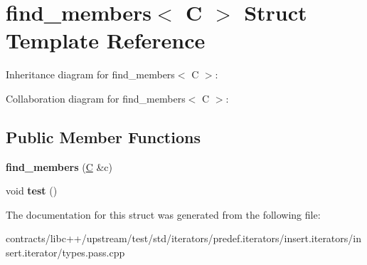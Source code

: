 \hypertarget{structfind__members}{}\section{find\+\_\+members$<$ C $>$ Struct Template Reference}
\label{structfind__members}


Inheritance diagram for find\+\_\+members$<$ C $>$\+:


Collaboration diagram for find\+\_\+members$<$ C $>$\+:
\subsection*{Public Member Functions}
\begin{DoxyCompactItemize}
\item 
\mbox{\label{structfind__members_a7dd876baa7f8ad06071b821a01369af6}} 
{\bfseries find\+\_\+members} (\mbox{\hyperlink{struct_c}{C}} \&c)
\item 
\mbox{\label{structfind__members_ac07ec46e8701a7bd1600c0a17fd39d88}} 
void {\bfseries test} ()
\end{DoxyCompactItemize}


The documentation for this struct was generated from the following file\+:\begin{DoxyCompactItemize}
\item 
contracts/libc++/upstream/test/std/iterators/predef.\+iterators/insert.\+iterators/insert.\+iterator/types.\+pass.\+cpp\end{DoxyCompactItemize}
